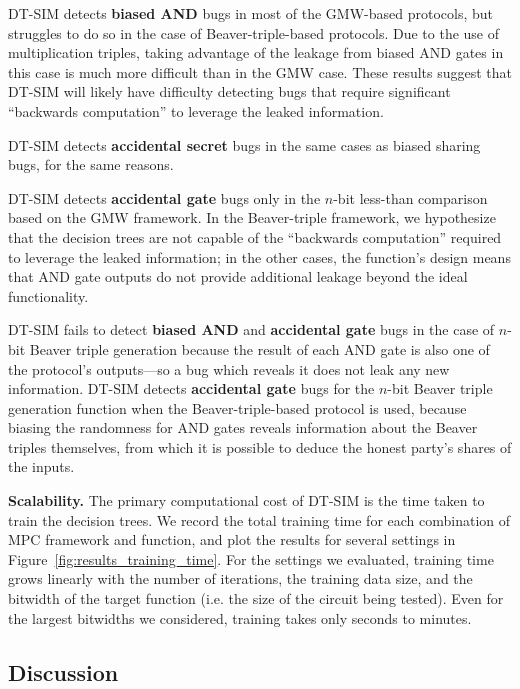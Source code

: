 \documentclass[compsoc, conference, a4paper, 10pt, times]{IEEEtran}
\renewcommand{\paragraph}[1]{\vspace*{2pt}\noindent\textbf{#1}}
\newcommand{\toolname}{\textsc{DT-SIM}\xspace}
\begin{document}
\toolname detects \textbf{biased AND} bugs in most of the GMW-based protocols, but struggles to do so in the case of Beaver-triple-based protocols. Due to the use of multiplication triples, taking advantage of the leakage from biased AND gates in this case is much more difficult than in the GMW case. These results suggest that \toolname will likely have difficulty detecting bugs that require significant ``backwards computation'' to leverage the leaked information. 

\toolname detects \textbf{accidental secret} bugs in the same cases as biased sharing bugs, for the same reasons.

\toolname detects \textbf{accidental gate} bugs only in the $n$-bit less-than comparison based on the GMW framework. In the Beaver-triple framework, we hypothesize that the decision trees are not capable of the ``backwards computation'' required to leverage the leaked information; in the other cases, the function's design means that AND gate outputs do not provide additional leakage beyond the ideal functionality.

\toolname fails to detect \textbf{biased AND} and \textbf{accidental gate} bugs in the case of $n$-bit Beaver triple generation because the result of each AND gate is also one of the protocol's outputs---so a bug which reveals it does not leak any new information. \toolname detects \textbf{accidental gate} bugs for the $n$-bit Beaver triple generation function when the Beaver-triple-based protocol is used, because biasing the randomness for AND gates reveals information about the Beaver triples themselves, from which it is possible to deduce the honest party's shares of the inputs.


\paragraph{Scalability.}
The primary computational cost of \toolname is the time taken to train the decision trees. We record the total training time for each combination of MPC framework and function, and plot the results for several settings in Figure~\ref{fig:results_training_time}. For the settings we evaluated, training time grows linearly with the number of iterations, the training data size, and the bitwidth of the target function (i.e. the size of the circuit being tested). Even for the largest bitwidths we considered, training takes only seconds to minutes.

\subsection{Discussion}
\end{document}
